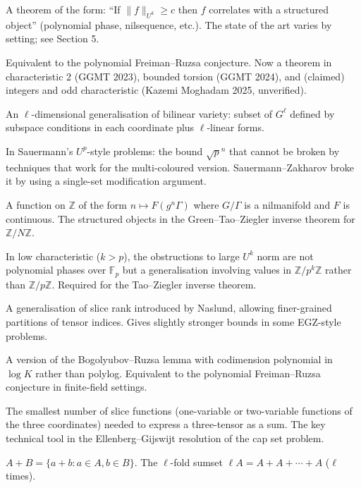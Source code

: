 \documentclass[11pt,a4paper]{article}
\theoremstyle{plain}
\theoremstyle{definition}
\theoremstyle{remark}
\newcommand{\F}{\mathbb{F}}
\newcommand{\Z}{\mathbb{Z}}
\begin{document}
\begin{description}[leftmargin=0pt]
\item[\textbf{Inverse theorem for $U^k$}] A theorem of the form: ``If $\|f\|_{U^k} \geq c$ then $f$ correlates with a structured object'' (polynomial phase, nilsequence, etc.). The state of the art varies by setting; see Section 5.

\item[\textbf{Marton's conjecture}] Equivalent to the polynomial Freiman--Ruzsa conjecture. Now a theorem in characteristic 2 (GGMT 2023), bounded torsion (GGMT 2024), and (claimed) integers and odd characteristic (Kazemi Moghadam 2025, unverified).

\item[\textbf{Multilinear variety}] An $\ell$-dimensional generalisation of bilinear variety: subset of $G^\ell$ defined by subspace conditions in each coordinate plus $\ell$-linear forms.

\item[\textbf{Multi-coloured barrier}] In Sauermann's $U^p$-style problems: the bound $\sqrt{p}^n$ that cannot be broken by techniques that work for the multi-coloured version. Sauermann--Zakharov broke it by using a single-set modification argument.

\item[\textbf{Nilsequence}] A function on $\Z$ of the form $n \mapsto F(g^n \Gamma)$ where $G/\Gamma$ is a nilmanifold and $F$ is continuous. The structured objects in the Green--Tao--Ziegler inverse theorem for $\Z/N\Z$.

\item[\textbf{Non-classical polynomial}] In low characteristic ($k > p$), the obstructions to large $U^k$ norm are not polynomial phases over $\F_p$ but a generalisation involving values in $\Z/p^k\Z$ rather than $\Z/p\Z$. Required for the Tao--Ziegler inverse theorem.

\item[\textbf{Partition rank}] A generalisation of slice rank introduced by Naslund, allowing finer-grained partitions of tensor indices. Gives slightly stronger bounds in some EGZ-style problems.

\item[\textbf{Polynomial Bogolyubov}] A version of the Bogolyubov--Ruzsa lemma with codimension polynomial in $\log K$ rather than polylog. Equivalent to the polynomial Freiman--Ruzsa conjecture in finite-field settings.

\item[\textbf{Slice rank}] The smallest number of slice functions (one-variable or two-variable functions of the three coordinates) needed to express a three-tensor as a sum. The key technical tool in the Ellenberg--Gijswijt resolution of the cap set problem.

\item[\textbf{Sumset}] $A + B = \{a + b : a \in A, b \in B\}$. The $\ell$-fold sumset $\ell A = A + A + \cdots + A$ ($\ell$ times).
\end{description}
\end{document}
